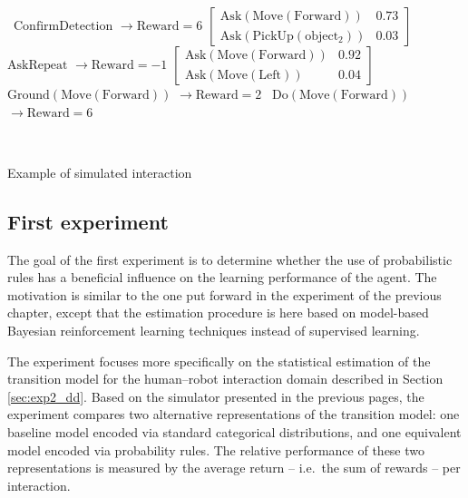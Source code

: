 \begin{Transcript}[p!]
\begin{normalsize}
\begin{dialogue}
 \ $\mathrm{ConfirmDetection}$ \hspace{34mm} $\rightarrow \mathrm{Reward} = 6$ \vspace{3mm}
 $\begin{bmatrix}\mathrm{Ask(Move(Forward))} & 0.73 \\
\mathrm{Ask(PickUp(object_2))}& 0.03 \end{bmatrix}$ \vspace{3mm}
 \ $\mathrm{AskRepeat}$ \hspace{47mm} $\rightarrow \mathrm{Reward} = -1$ \vspace{3mm}
 $\begin{bmatrix}\mathrm{Ask(Move(Forward))} & 0.92 \\
\mathrm{Ask(Move(Left))} & 0.04 \end{bmatrix}$ \vspace{3mm}
 \ $\mathrm{Ground(Move(Forward))}$ \hspace{22mm} $\rightarrow \mathrm{Reward} = 2$ \vspace{3mm}
 \ $\mathrm{Do(Move(Forward))}$ \hspace{31mm} $\rightarrow \mathrm{Reward} = 6$
\end{dialogue}
$\phantom{a}$\hspace{13mm} \vspace{3mm}
\end{normalsize}
\caption{Example of simulated interaction}
\end{Transcript}

\subsection{First experiment}

The goal of the first experiment is to determine whether the use of probabilistic rules has a beneficial influence on the learning performance of the agent. The motivation is  similar to the one put forward in the experiment of the previous chapter, except that the estimation procedure is here based on model-based Bayesian reinforcement learning techniques instead of supervised learning. 

The experiment focuses more specifically on the statistical estimation of the transition model for the human--robot interaction domain described in Section \ref{sec:exp2_dd}. Based on the simulator presented in the previous pages, the experiment compares two alternative representations of the transition model: one baseline model encoded via standard categorical distributions, and one equivalent model encoded via probability rules.  The relative performance of these two representations is measured by the average return -- i.e.\ the sum of rewards -- per interaction. 

